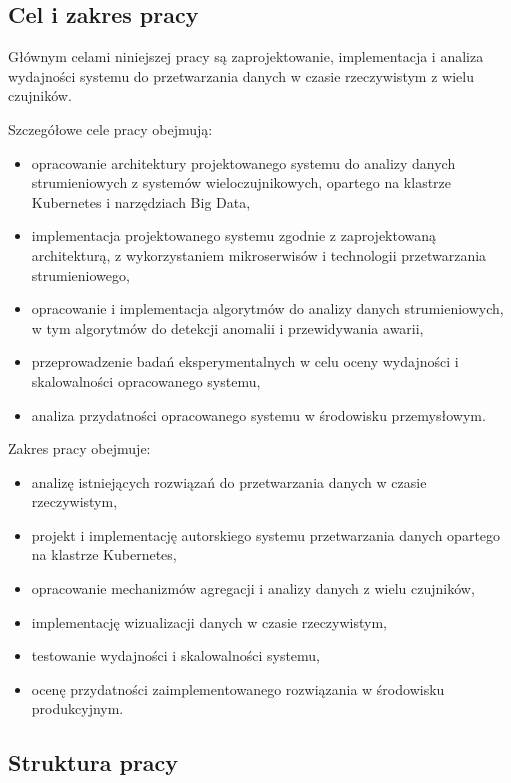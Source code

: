 \subsection{Cel i zakres pracy}
\label{subsec:cel}

Głównym celami niniejszej pracy są zaprojektowanie, implementacja i analiza wydajności systemu do przetwarzania danych w
czasie rzeczywistym z wielu czujników.

\vspace{0.3em}

Szczegółowe cele pracy obejmują:
\begin{itemize}
    \item opracowanie architektury projektowanego systemu do analizy danych strumieniowych z systemów wieloczujnikowych, opartego na klastrze Kubernetes i narzędziach Big Data,
    \item implementacja projektowanego systemu zgodnie z zaprojektowaną architekturą, z wykorzystaniem mikroserwisów i technologii przetwarzania strumieniowego,
    \item opracowanie i implementacja algorytmów do analizy danych strumieniowych, w tym algorytmów do detekcji anomalii i przewidywania awarii,
    \item przeprowadzenie badań eksperymentalnych w celu oceny wydajności i skalowalności opracowanego systemu,
    \item analiza przydatności opracowanego systemu w środowisku przemysłowym.
\end{itemize}

\newpage

Zakres pracy obejmuje:
\begin{itemize}
    \item analizę istniejących rozwiązań do przetwarzania danych w czasie rzeczywistym,
    \item projekt i implementację autorskiego systemu przetwarzania danych opartego na klastrze Kubernetes,
    \item opracowanie mechanizmów agregacji i analizy danych z wielu czujników,
    \item implementację wizualizacji danych w czasie rzeczywistym,
    \item testowanie wydajności i skalowalności systemu,
    \item ocenę przydatności zaimplementowanego rozwiązania w środowisku produkcyjnym.
\end{itemize}

\subsection{Struktura pracy}
\label{subsec:struktura}

